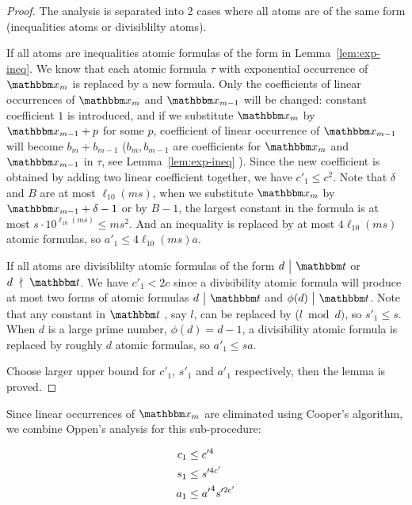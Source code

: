 \begin{proof}
   
The analysis is separated into 2 cases where all atoms are of the same form (inequalities atoms or divisiblilty atoms). 

If all atoms are inequalities atomic formulas of the form in Lemma~\ref{lem:exp-ineq}. We know that each atomic formula $\tau$ with exponential occurrence of $\ivarx_m$ is replaced by a new formula. Only the coefficients of linear occurrences of $\ivarx_m$ and $\ivarx_{m-1}$ will be changed: constant coefficient $1$ is introduced, and if we substitute $\ivarx_m$ by $\ivarx_{m-1}+p$ for some $p$, coefficient of linear occurrence of $\ivarx_{m-1}$ will become $b_m+b_{m-1}$ ($b_m,b_{m-1}$ are coefficients for $\ivarx_{m}$ and $\ivarx_{m-1}$ in $\tau$, see Lemma~\ref{lem:exp-ineq} ). Since the new coefficient is obtained by adding two linear coefficient together, we have $c'_1\le c^2$. Note that $\delta$ and $B$ are at most $\ell_{10}(ms)$, when we substitute $\ivarx_m$ by $\ivarx_{m-1}+\delta-1$ or by $B-1$, the largest constant in the formula is at most $s\cdot  10^{\ell_{10}(ms)}\le ms^2$. And an inequality is replaced by at most $4\ell_{10}(ms)$ atomic formulas, so $a'_1\le 4\ell_{10}(ms)a$.

If all atoms are divisiblilty atomic formulas of the form $d \ \big | \ \iterm$ or $d \ \nmid \ \iterm$. We have $c'_1<2c$ since a divisibility atomic formula  will produce at most two forms of atomic formulas $d \ \big | \ \iterm$ and $\phi(d) \ \big | \ \iterm$. Note that any constant in $\iterm$ , say $l$, can be replaced by ($l \bmod d)$, so $s'_1\le s$. When $d$ is a large prime number, $\phi(d)=d-1$, a divisibility atomic formula is replaced by roughly $d$ atomic formulas, so $a'_1\le sa$. 

Choose larger upper bound for $c'_1$, $s'_1$ and $a'_1$ respectively, then the lemma is proved.

\end{proof}

Since linear occurrences of $\ivarx_m$ are eliminated using Cooper's algorithm, we combine Oppen's analysis for this sub-procedure:

\begin{lemma}\label{lem:cpx oppen}
    \begin{align}
        c_1&\le c'^4 \notag \\
        s_1&\le s'^{4c'} \notag\\
        a_1&\le {a'}^4 s'^{2c'}\notag 
    \end{align} 
\end{lemma}

